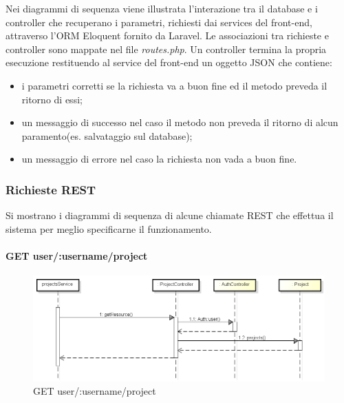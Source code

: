 Nei diagrammi di sequenza viene illustrata l'interazione tra il \gls{database} e i controller che recuperano i parametri, richiesti dai services del front-end, attraverso l'\gls{ORM} Eloquent fornito da \gls{Laravel}. Le associazioni tra richieste e controller sono mappate nel file \textit{routes.php}. Un controller termina la propria esecuzione restituendo al service del front-end un oggetto JSON che contiene:
\begin{itemize}
	\item i parametri corretti se la richiesta va a buon fine ed il metodo preveda il ritorno di essi;
	\item un messaggio di successo nel caso il metodo non preveda il ritorno di alcun paramento(es. salvataggio sul \gls{database});
	\item un messaggio di errore nel caso la richiesta non vada a buon fine.
\end{itemize}

\subsubsection{Richieste REST}
Si mostrano i diagrammi di sequenza di alcune chiamate REST che effettua il sistema per meglio specificarne il funzionamento.

\newpage

\paragraph{GET user/:username/project}
\begin{figure}[h]
	\centering
	\includegraphics[width=0.7\linewidth]{img/GET_projects}
	\caption[GET user/:username/project]{GET user/:username/project}
	\label{fig:GET user/:username/project}
\end{figure}

